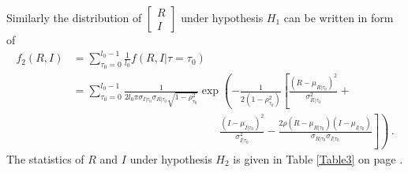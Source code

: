 Similarly the distribution of  
$\begin{bmatrix}
  R \\
  I
\end{bmatrix}$
under hypothesis $H_1$ can be written in form of 
\begin{equation}
  \begin{split}
  f_2(R, I) &= \sum_{\tau_0 = 0}^{l_0-1} \frac{1}{l_0}f(R, I|\tau=\tau_0)\\
  &= \sum_{\tau_0 = 0}^{l_0-1}\frac{1}{2l_0\pi\sigma_{I|\tau_0}\sigma_{R|\tau_0}\sqrt{1 - \rho_{\tau_0}^2}}\exp\left( -\frac{1}{2(1-\rho_{\tau_0}^2)}\left[ \frac{(R-\mu_{R|\tau_0})^2}{\sigma_{R|\tau_0}^2} + \right.\right.\\
  & \left. \left. \;\;\;\;\;\;\;\;\;\;\;\;\;\;\;\; \;\;\;\;\;\;\;\;\;\;\;\;\;\;\;\; \;\;\;\;\;\;\;\;\;\;\;\;\;\;\;\; \frac{(I-\mu_{I|\tau_0})^2}{\sigma_{I|\tau_0}^2} - \frac{2\rho(R-\mu_{R|\tau_0})(I-\mu_{I|\tau_0})}{\sigma_{R|\tau_0}\sigma_{I|\tau_0}}\right] \right)\,.
\end{split}
  \label{f_1underH1}
\end{equation}
The statistics of $R$ and $I$ under hypothesis $H_2$ is given in Table \ref{Table3} on page \pageref{Table3}. 

